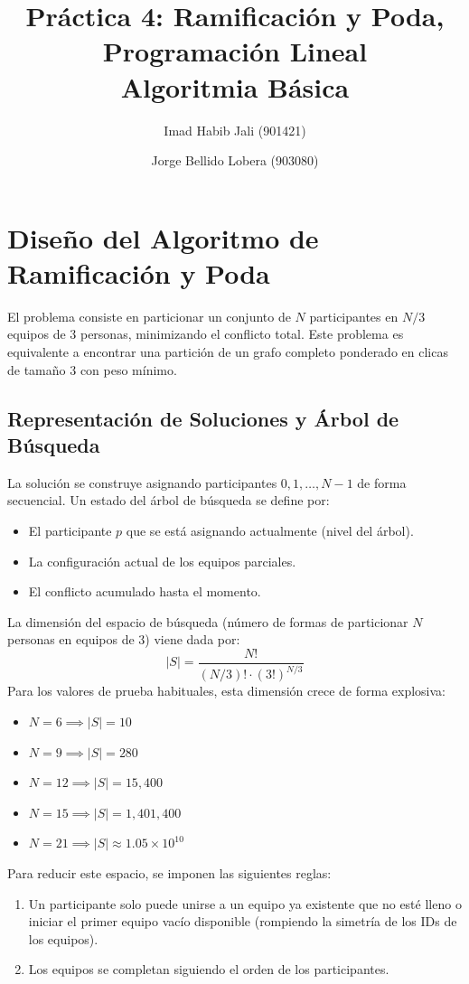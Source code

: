 \documentclass[a4paper,11pt]{article}
\title{Práctica 4: Ramificación y Poda, Programación Lineal \\ \large Algoritmia Básica}
\author{Imad Habib Jali (901421) \and Jorge Bellido Lobera (903080)}
\date{}
\begin{document}
\maketitle

\section{Diseño del Algoritmo de Ramificación y Poda}

El problema consiste en particionar un conjunto de $N$ participantes en $N/3$ equipos de 3 personas, minimizando el conflicto total. Este problema es equivalente a encontrar una partición de un grafo completo ponderado en clicas de tamaño 3 con peso mínimo.

\subsection{Representación de Soluciones y Árbol de Búsqueda}
La solución se construye asignando participantes $0, 1, \dots, N-1$ de forma secuencial. Un estado del árbol de búsqueda se define por:
\begin{itemize}
    \item El participante $p$ que se está asignando actualmente (nivel del árbol).
    \item La configuración actual de los equipos parciales.
    \item El conflicto acumulado hasta el momento.
\end{itemize}

La dimensión del espacio de búsqueda (número de formas de particionar $N$ personas en equipos de 3) viene dada por:
\[ |S| = \frac{N!}{(N/3)! \cdot (3!)^{N/3}} \]
Para los valores de prueba habituales, esta dimensión crece de forma explosiva:
\begin{itemize}
    \item $N=6 \implies |S| = 10$
    \item $N=9 \implies |S| = 280$
    \item $N=12 \implies |S| = 15,400$
    \item $N=15 \implies |S| = 1,401,400$
    \item $N=21 \implies |S| \approx 1.05 \times 10^{10}$
\end{itemize}

Para reducir este espacio, se imponen las siguientes reglas:
\begin{enumerate}
    \item Un participante solo puede unirse a un equipo ya existente que no esté lleno o iniciar el primer equipo vacío disponible (rompiendo la simetría de los IDs de los equipos).
    \item Los equipos se completan siguiendo el orden de los participantes.
\end{enumerate}
\end{document}
